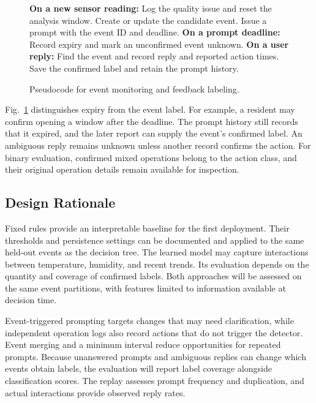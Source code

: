 \documentclass[conference]{IEEEtran}
\begin{document}
\begin{figure}[t]
\begin{minipage}{\columnwidth}
\small
\begin{algorithmic}[1]
\STATE \textbf{On a new sensor reading:}
    \STATE Log the quality issue and reset the analysis window.
    \STATE Create or update the candidate event.
        \STATE Issue a prompt with the event ID and deadline.
    \ENDIF
\ENDIF
\STATE \textbf{On a prompt deadline:}
    \STATE Record expiry and mark an unconfirmed event unknown.
\ENDIF
\STATE \textbf{On a user reply:}
\STATE Find the event and record reply and reported action times.
    \STATE Save the confirmed label and retain the prompt history.
\ENDIF
\end{algorithmic}
\end{minipage}
\caption{Pseudocode for event monitoring and feedback labeling.}
\label{fig:event-pseudocode}
\end{figure}

Fig.~\ref{fig:event-pseudocode} distinguishes expiry from the event label. For example, a resident may confirm opening a window after the deadline. The prompt history still records that it expired, and the later report can supply the event's confirmed label. An ambiguous reply remains unknown unless another record confirms the action. For binary evaluation, confirmed mixed operations belong to the action class, and their original operation details remain available for inspection.

\subsection{Design Rationale}
Fixed rules provide an interpretable baseline for the first deployment. Their thresholds and persistence settings can be documented and applied to the same held-out events as the decision tree. The learned model may capture interactions between temperature, humidity, and recent trends. Its evaluation depends on the quantity and coverage of confirmed labels. Both approaches will be assessed on the same event partitions, with features limited to information available at decision time.

Event-triggered prompting targets changes that may need clarification, while independent operation logs also record actions that do not trigger the detector. Event merging and a minimum interval reduce opportunities for repeated prompts. Because unanswered prompts and ambiguous replies can change which events obtain labels, the evaluation will report label coverage alongside classification scores. The replay assesses prompt frequency and duplication, and actual interactions provide observed reply rates.
\end{document}
